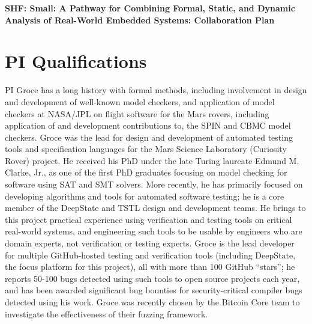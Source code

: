 \documentclass[12pt]{article}
\begin{document}

\begin{center}
{\Large\sf\textbf{SHF: Small: A Pathway for Combining Formal, Static, and
  Dynamic Analysis of Real-World Embedded Systems: Collaboration Plan}}
\end{center}

\section{PI Qualifications}

PI Groce has a long history with formal methods, including involvement in design and development of well-known model checkers, and application of model checkers at NASA/JPL on flight software for the Mars rovers, including application of and development contributions to, the SPIN and CBMC model checkers.  Groce was the lead for design and development of automated testing tools and specification languages for the Mars Science Laboratory (Curiosity Rover) project.  He received his PhD under the late Turing laureate Edmund M. Clarke, Jr., as one of the first PhD graduates focusing on model checking for software using SAT and SMT solvers.  More recently, he has primarily focused on developing algorithms and tools for automated software testing; he is a core member of the DeepState and TSTL design and development teams.  He brings to this project practical experience using verification and testing tools on critical real-world systems, and engineering such tools to be usable by engineers who are domain experts, not verification or testing experts.  Groce is the lead developer for multiple GitHub-hosted testing and verification tools (including DeepState, the focus platform for this project), all with more than 100 GitHub ``stars''; he reports 50-100 bugs detected using such tools to open source projects each year, and has been awarded significant bug bounties for security-critical compiler bugs detected using his work.  Groce was recently chosen by the Bitcoin Core team to investigate the effectiveness of their fuzzing framework.
\end{document}
